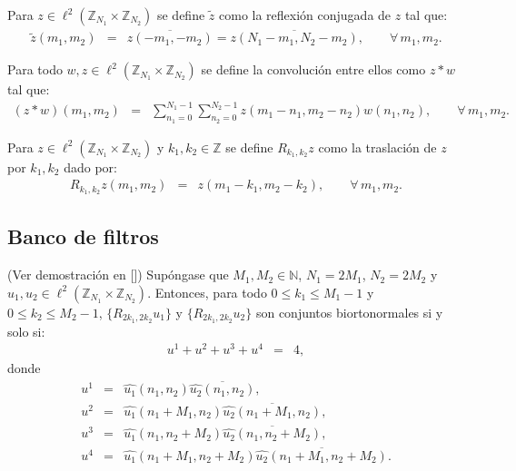 \begin{definition}
Para $z\in \ell^2(\mathbb{Z}_{N_1}\times\mathbb{Z}_{N_2})$ se define $\tilde{z}$ como la reflexi\'on conjugada de $z$ tal que:
\begin{eqnarray}
\tilde{z}(m_1,m_2)&=&\overline{z(-m_1,-m_2)}=\overline{z(N_1-m_1,N_2-m_2)},\qquad\forall\,m_1,m_2.\nonumber
\end{eqnarray}
\end{definition}

\begin{definition}
Para todo $w,z\in \ell^2(\mathbb{Z}_{N_1}\times\mathbb{Z}_{N_2})$ se define la convoluci\'on entre ellos como $z\ast w$ tal que:
\begin{eqnarray}
(z\ast w)(m_1,m_2)&=&\sum_{n_1=0}^{N_1-1}\sum_{n_2=0}^{N_2-1}z(m_1-n_1,m_2-n_2)w(n_1,n_2),\qquad\forall\,m_1,m_2.\nonumber
\end{eqnarray}
\end{definition}

\begin{definition}
Para $z\in \ell^2(\mathbb{Z}_{N_1}\times\mathbb{Z}_{N_2})$ y $k_1,k_2\in\mathbb{Z}$ se define $R_{k_1,k_2}{z}$ como la traslaci\'on de $z$ por $k_1,k_2$ dado por:
\begin{eqnarray}
R_{k_1,k_2}{z}(m_1,m_2)&=&z(m_1-k_1,m_2-k_2),\qquad\forall\,m_1,m_2.\nonumber
\end{eqnarray}
\end{definition}

\subsection{Banco de filtros}

\begin{theorem}
(Ver demostraci\'on en [\textcolor{cyan}{\cite{12}}]) Sup\'ongase que $M_1,M_2\in\mathbb{N}$, $N_1=2M_1$, $N_2=2M_2$ y $u_1,u_2\in \ell^2(\mathbb{Z}_{N_1}\times\mathbb{Z}_{N_2})$. Entonces, para todo $0\leq k_1 \leq M_1-1$ y\linebreak $0\leq k_2 \leq M_2-1$, $\{R_{2k_1,2k_2}u_1\}$ y $\{R_{2k_1,2k_2}u_2\}$ son conjuntos biortonormales si y solo si:
\begin{eqnarray}
u^1+u^2+u^3+u^4&=&4,\nonumber
\end{eqnarray}
donde
\begin{eqnarray}
u^1&=&\hat{u_1}(n_1,n_2)\overline{\hat{u_2}(n_1,n_2)},\nonumber\\
u^2&=&\hat{u_1}(n_1+M_1,n_2)\overline{\hat{u_2}(n_1+M_1,n_2)},\nonumber\\
u^3&=&\hat{u_1}(n_1,n_2+M_2)\overline{\hat{u_2}(n_1,n_2+M_2)},\nonumber\\
u^4&=&\hat{u_1}(n_1+M_1,n_2+M_2)\overline{\hat{u_2}(n_1+M_1,n_2+M_2)}.\nonumber
\end{eqnarray}
\end{theorem}

